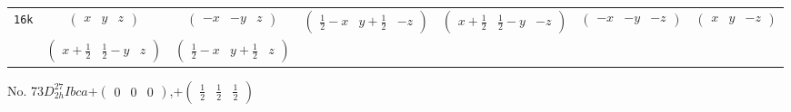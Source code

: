 \documentclass[fleqn,9pt,landscape]{jsarticle}
\begin{document}
\begin{center}
\begin{longtable}{ccccccc}
{\tt 16k} & $ \begin{pmatrix} x & y & z \end{pmatrix} $ & $ \begin{pmatrix} - x & - y & z \end{pmatrix} $ & $ \begin{pmatrix} \frac{1}{2} - x & y + \frac{1}{2} & - z \end{pmatrix} $ & $ \begin{pmatrix} x + \frac{1}{2} & \frac{1}{2} - y & - z \end{pmatrix} $ & $ \begin{pmatrix} - x & - y & - z \end{pmatrix} $ & $ \begin{pmatrix} x & y & - z \end{pmatrix} $ \\
& $ \begin{pmatrix} x + \frac{1}{2} & \frac{1}{2} - y & z \end{pmatrix} $ & $ \begin{pmatrix} \frac{1}{2} - x & y + \frac{1}{2} & z \end{pmatrix} $ & $  $ & $  $ & $  $ & $  $ \\
\end{longtable}
\end{center}
\newpage
No. 73\quad$D_{2h}^{27}$\quad$Ibca$\quad[ orthorhombic ]\quad$+\begin{pmatrix} 0 & 0 & 0 \end{pmatrix}$,\quad $+\begin{pmatrix} \frac{1}{2} & \frac{1}{2} & \frac{1}{2} \end{pmatrix}$
\end{document}
